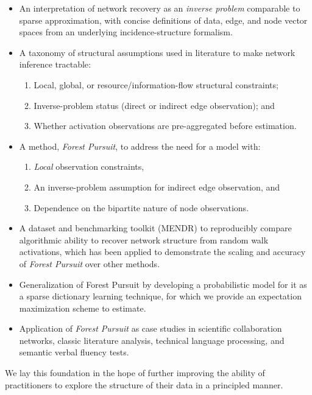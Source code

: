 \documentclass[%
	12pt,
		oneside,
		letterpaper
]{book}
\providecommand{\tightlist}{%
  \setlength{\itemsep}{0pt}\setlength{\parskip}{0pt}}\usepackage{longtable,booktabs,array}
\begin{document}
\begin{itemize}
\tightlist
\item
  An interpretation of network recovery as an \emph{inverse problem} comparable to sparse approximation, with concise definitions of data, edge, and node vector spaces from an underlying incidence-structure formalism.
\item
  A taxonomy of structural assumptions used in literature to make network inference tractable:

  \begin{enumerate}
  \def\labelenumi{\arabic{enumi})}
  \tightlist
  \item
    Local, global, or resource/information-flow structural constraints;
  \item
    Inverse-problem status (direct or indirect edge observation); and
  \item
    Whether activation observations are pre-aggregated before estimation.
  \end{enumerate}
\item
  A method, \emph{Forest Pursuit}, to address the need for a model with:

  \begin{enumerate}
  \def\labelenumi{\arabic{enumi})}
  \tightlist
  \item
    \emph{Local} observation constraints,
  \item
    An inverse-problem assumption for indirect edge observation, and
  \item
    Dependence on the bipartite nature of node observations.\\
  \end{enumerate}
\item
  A dataset and benchmarking toolkit (MENDR) to reproducibly compare algorithmic ability to recover network structure from random walk activations, which has been applied to demonstrate the scaling and accuracy of \emph{Forest Pursuit} over other methods.
\item
  Generalization of Forest Pursuit by developing a probabilistic model for it as a sparse dictionary learning technique, for which we provide an expectation maximization scheme to estimate.\\
\item
  Application of \emph{Forest Pursuit} as case studies in scientific collaboration networks, classic literature analysis, technical language processing, and semantic verbal fluency tests.
\end{itemize}

We lay this foundation in the hope of further improving the ability of practitioners to explore the structure of their data in a principled manner.


\singlespacing
\printbibliography

\doublespacing
\end{document}
